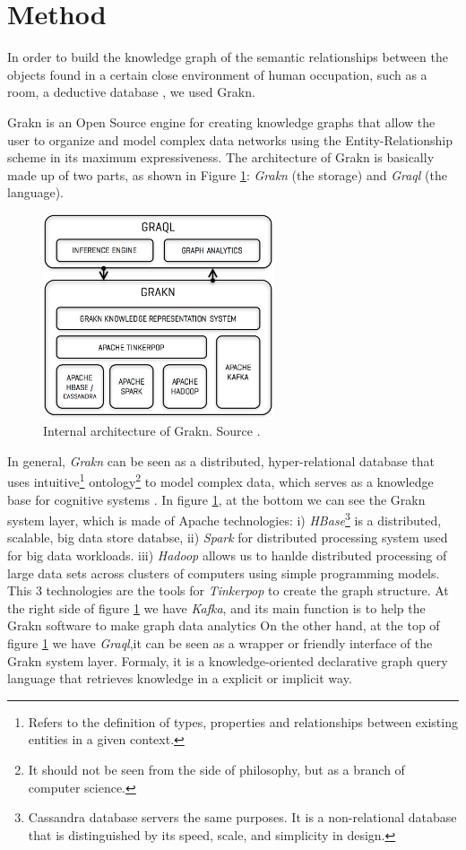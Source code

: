 \section{Method}
\label{sec:metodo}

In order to build the knowledge graph of the semantic relationships between 
the objects found in a certain close environment of human occupation, such as 
a room, a deductive database \cite{stichbury}, we used Grakn.

Grakn is an Open Source engine for creating knowledge graphs that allow the 
user to organize and model complex data networks using the Entity-Relationship 
scheme in its maximum expressiveness. The architecture of Grakn is basically 
made up of two parts, as shown in Figure \ref{fig:arch}: \textit{Grakn} 
(the storage) and \textit{Graql} (the language).

\begin{figure}[H]
    \centering
    \includegraphics[width=6.8cm]{figures/architecture}
    \caption{Internal architecture of Grakn.
    Source \cite{stichbury}.}
    \label{fig:arch}
\end{figure}

In general, \textit{Grakn} can be seen as a distributed, hyper-relational 
database that uses intuitive\footnote{Refers to the definition of types, 
properties and relationships between existing entities in a given context.} 
ontology\footnote{It should not be seen from the side of philosophy, but as a 
branch of computer science.}  to model complex data, which serves as a 
knowledge base for cognitive systems \cite{dbengines}. 
In figure \ref{fig:arch}, at the bottom we can see the Grakn system layer, 
which is made of Apache technologies: %
i) \textit{HBase}\footnote{Cassandra database servers the same purposes. It is 
a non-relational database that is distinguished by its speed, scale, 
and simplicity in design.} is a distributed, scalable, big data store databse, 
ii) \textit{Spark} for distributed processing system used for 
big data workloads.
iii) \textit{Hadoop} allows us to hanlde distributed processing of large data 
sets across clusters of computers using simple programming models.
This 3 technologies are the tools for \textit{Tinkerpop} to create the graph 
structure. At the right side of figure \ref{fig:arch} we have \textit{Kafka},
and its main function is to help the Grakn software to make graph data analytics
On the other hand, at the top of figure \ref{fig:arch} we have
\textit{Graql},it can be seen as a wrapper or friendly interface of the Grakn
system layer. Formaly, it is a knowledge-oriented declarative graph query 
language that retrieves knowledge in a explicit or implicit way.

